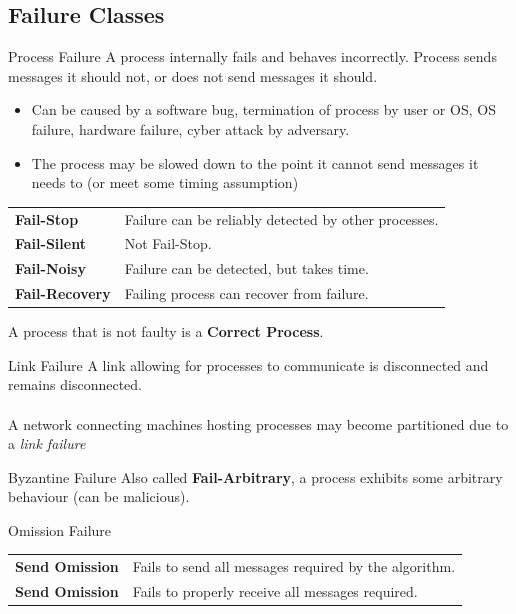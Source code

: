 \subsection{Failure Classes}
\begin{definitionbox}{Process Failure}
    A process internally fails and behaves incorrectly. Process sends messages it should not, or does not send messages it should.
    \begin{itemize}
        \item Can be caused by a software bug, termination of process by user or OS, OS failure, hardware failure, cyber attack by adversary.
        \item The process may be slowed down to the point it cannot send messages it needs to (or meet some timing assumption)
    \end{itemize}
    \begin{center}
        \begin{tabular}{l l}
            \textbf{Fail-Stop} & Failure can be reliably detected by other processes. \\
            \textbf{Fail-Silent} & Not Fail-Stop. \\
            \textbf{Fail-Noisy} & Failure can be detected, but takes time. \\
            \textbf{Fail-Recovery} & Failing process can recover from failure. \\
        \end{tabular}
    \end{center}
    A process that is not faulty is a \textbf{Correct Process}. 
\end{definitionbox}


\begin{tcbraster}[raster columns=2, raster equal height]
    \begin{definitionbox}{Link Failure}
        A link allowing for processes to communicate is disconnected and remains disconnected.
        \\
        \\ A network connecting machines hosting processes may become partitioned due to a \textit{link failure}
    \end{definitionbox}
    \begin{definitionbox}{Byzantine Failure}
        Also called \textbf{Fail-Arbitrary}, a process exhibits some arbitrary behaviour (can be malicious).
    \end{definitionbox}
\end{tcbraster}
\begin{definitionbox}{Omission Failure}
    \begin{center}
        \begin{tabular}{l l}
            \textbf{Send Omission} & Fails to send all messages required by the algorithm. \\
            \textbf{Send Omission} & Fails to properly receive all messages required. \\
        \end{tabular}
    \end{center}
\end{definitionbox}

